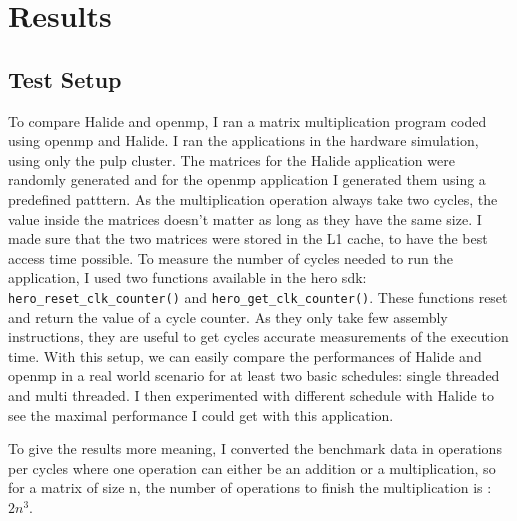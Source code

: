 
\chapter{Results}
\section{Test Setup}
	To compare Halide and \gls{openmp}, I ran a matrix multiplication program coded using \gls{openmp} and Halide. I ran the applications in the hardware simulation, using only the \gls{pulp} cluster. 
	The matrices for the Halide application were randomly generated and for the \gls{openmp} application I generated them using a predefined patttern. As the multiplication operation always take two cycles, the value inside the matrices doesn't matter as long as they have the same size.
	I made sure that the two matrices were stored in the L1 cache, to have the best access time possible.
	To measure the number of cycles needed to run the application, I used two functions available in the hero sdk: \texttt{hero\_reset\_clk\_counter()} and \texttt{hero\_get\_clk\_counter()}. These functions reset and return the value of a cycle counter. As they only take few assembly instructions, they are useful to get cycles accurate measurements of the execution time.
	With this setup, we can easily compare the performances of Halide and \gls{openmp} in a real world scenario for at least two basic schedules: single threaded and multi threaded. I then experimented with different schedule with Halide to see the maximal performance I could get with this application.

	To give the results more meaning, I converted the benchmark data in operations per cycles where one operation can either be an addition or a multiplication, so for a matrix of size n, the number of operations to finish the multiplication is : $2n^3$.

